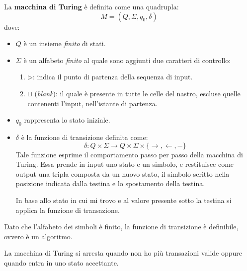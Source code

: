 \begin{definizione}
    La \textbf{macchina di Turing} è definita come una quadrupla:
    \begin{equation}
        M = (Q, \Sigma, q_0, \delta)
    \end{equation}
    dove:
    \begin{itemize}
        \item $Q$ è un insieme \textit{finito} di stati.
        \item $\Sigma$ è un alfabeto \textit{finito} al quale sono aggiunti due
              caratteri di controllo:
              \begin{enumerate}
                  \item $\triangleright$: indica il punto di partenza della sequenza di input.
                  \item $\sqcup$ (\textit{blank}): il quale è presente in tutte le celle
                        del nastro, escluse quelle contenenti l'input, nell'istante di partenza.
              \end{enumerate}
        \item $q_0$ rappresenta lo stato iniziale.
        \item $\delta$ è la funzione di transizione definita come:
              \begin{equation}
                  \delta: Q \times \Sigma \longrightarrow Q \times \Sigma \times \{\rightarrow, \leftarrow, -\}
              \end{equation}
              Tale funzione esprime il comportamento passo per passo della macchina di
              Turing. Essa prende in input uno stato e un simbolo, e restituisce come output
              una tripla composta da un nuovo stato, il simbolo scritto nella posizione
              indicata dalla testina e lo spostamento della testina.

              In base allo stato in cui mi trovo e al valore presente sotto la testina
              si applica la funzione di transazione.
    \end{itemize}
\end{definizione}
\begin{osservazione}
    Dato che l'alfabeto dei simboli è finito, la funzione di transizione è definibile,
    ovvero è un algoritmo.
\end{osservazione}

La macchina di Turing si arresta quando non ho più transazioni valide oppure
quando entra in uno stato accettante.

